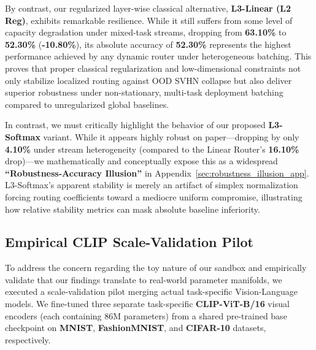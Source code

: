 By contrast, our regularized layer-wise classical alternative, \textbf{L3-Linear (L2 Reg)}, exhibits remarkable resilience. While it still suffers from some level of capacity degradation under mixed-task streams, dropping from \textbf{63.10\%} to \textbf{52.30\%} (\textbf{-10.80\%}), its absolute accuracy of \textbf{52.30\%} represents the highest performance achieved by any dynamic router under heterogeneous batching. This proves that proper classical regularization and low-dimensional constraints not only stabilize localized routing against OOD SVHN collapse but also deliver superior robustness under non-stationary, multi-task deployment batching compared to unregularized global baselines.

In contrast, we must critically highlight the behavior of our proposed \textbf{L3-Softmax} variant. While it appears highly robust on paper---dropping by only \textbf{4.10\%} under stream heterogeneity (compared to the Linear Router's \textbf{16.10\%} drop)---we mathematically and conceptually expose this as a widespread \textbf{``Robustness-Accuracy Illusion''} in Appendix~\ref{sec:robustness_illusion_app}. L3-Softmax's apparent stability is merely an artifact of simplex normalization forcing routing coefficients toward a mediocre uniform compromise, illustrating how relative stability metrics can mask absolute baseline inferiority.

\subsection{Empirical CLIP Scale-Validation Pilot}
\label{subsec:clip_pilot}
To address the concern regarding the toy nature of our sandbox and empirically validate that our findings translate to real-world parameter manifolds, we executed a scale-validation pilot merging actual task-specific Vision-Language models. We fine-tuned three separate task-specific \textbf{CLIP-ViT-B/16} visual encoders (each containing 86M parameters) from a shared pre-trained base checkpoint on \textbf{MNIST}, \textbf{FashionMNIST}, and \textbf{CIFAR-10} datasets, respectively.


